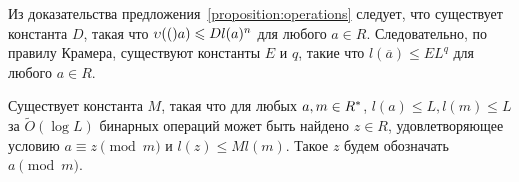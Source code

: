 \documentclass[_00_dissertation.tex]{subfiles}
\begin{document}
\begin{remark}
    Из доказательства предложения~\ref{proposition:operations} следует, что существует константа $D$, такая что $\upsilon(()a) \leqslant D l(a)^n$ для любого $a \in R$.
    Следовательно, по правилу Крамера, существуют константы $E$ и $q$, такие что $l(\overline{a}) \leq E L^q$ для любого $a \in R$.
\end{remark}

\begin{proposition}\label{proposition:mod}
    Существует константа $M$, такая что для любых $a, m \in R^{*}$, $l(a) \leq L, l(m) \leq L$ за $\tilde{O}(\log L)$ бинарных операций может быть найдено $z \in R$, удовлетворяющее условию $a \equiv z \pmod{m}$ и $l(z) \leq M l(m)$.
    Такое $z$ будем обозначать $a \pmod{m}$.
\end{proposition}
\end{document}
